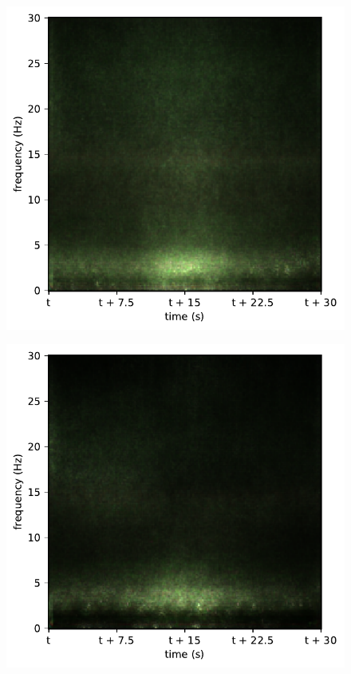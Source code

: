\begin{subfigure}{.16\textwidth}
  \centering
  \includegraphics[width=1\linewidth]{./../Article/pics/class_rnn_2}
  \caption{}
  \label{fig_1_33}
\end{subfigure}%
\begin{subfigure}{.16\textwidth}
  \centering
  \includegraphics[width=1\linewidth]{./../Article/pics/class_rnn_3}
  \caption{}
  \label{fig_1_34}
\end{subfigure}%

